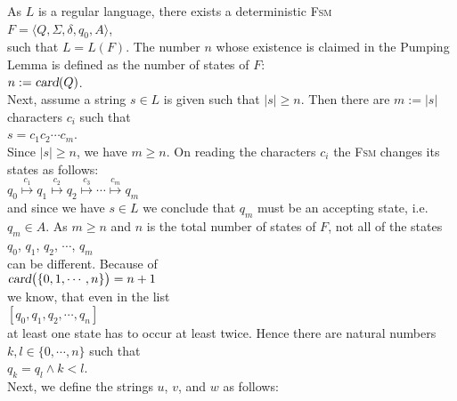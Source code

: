 \proofEng
As $L$ is a regular language, there exists a deterministic \textsc{Fsm}
\\[0.2cm]
\hspace*{1.3cm}
$F = \langle Q, \Sigma, \delta, q_0, A \rangle$,
\\[0.2cm]
such that $L = L(F)$.  The number $n$ whose existence is claimed in the Pumping Lemma is defined as
the number of states of $F$: 
\\[0.2cm]
\hspace*{1.3cm}
$n := \textsl{card}(Q)$.
\\[0.2cm]
Next, assume a string $s \in L$ is given such that $|s| \geq n$.  Then there are $m := |s|$
characters $c_i$ such that
\\[0.2cm]
\hspace*{1.3cm}
$s = c_1 c_2 \cdots c_m$.
\\[0.2cm]
Since $|s| \geq n$, we have $m \geq n$.  On reading the characters $c_i$ the \textsc{Fsm} changes its
states as follows:
\\[0.2cm]
\hspace*{1.3cm}
$q_0 \stackrel{c_1}{\longmapsto} q_1 \stackrel{c_2}{\longmapsto} q_2 \stackrel{c_3}{\longmapsto} \cdots \stackrel{c_m}{\longmapsto} q_m$
\\[0.2cm]
and since we have  $s \in L$ we conclude that  $q_m$ must be an accepting state, i.e.~$q_m \in A$.
As $m \geq n$ and $n$ is the total number of states of $F$, not all of the states 
\\[0.2cm]
\hspace*{1.3cm}
$q_0$, $q_1$, $q_2$, $\cdots$, $q_m$
\\[0.2cm]
can be different.
Because of
\\[0.2cm]
\hspace*{1.3cm}
$\textsl{card}\bigl(\{0,1,\cdots,n\}\bigr) = n+1$
\\[0.2cm]
we know, that even in the list
\\[0.2cm]
\hspace*{1.3cm}
$[q_0,q_1,q_2,\cdots, q_{n}]$
\\[0.2cm]
at least one state has to occur at least twice.  Hence there are natural numbers $k, l \in \{0,\cdots,n\}$ such that
\\[0.2cm]
\hspace*{1.3cm}
$q_k = q_l \wedge k < l$.
\\[0.2cm]
Next, we define the strings $u$, $v$, and $w$ as follows:
\\[0.2cm]
\hspace*{1.3cm}
